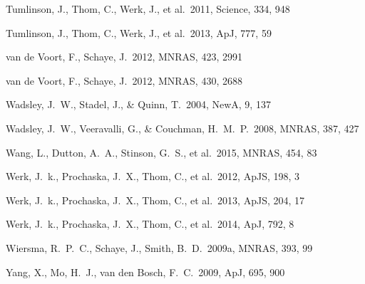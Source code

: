 \documentclass[useAMS,usenatbib]{mn2e}
\def \apj {ApJ}
\def \mnras {MNRAS}
\def \apjs {ApJS}
\def \na {NewA}
\begin{document}
\begin{thebibliography}{}
 Tumlinson, J., Thom, C., Werk, J., et al.\ 2011, Science, 334, 948

 Tumlinson, J., Thom, C., Werk, J., et al.\ 2013, \apj, 777, 59


%
 van de Voort, F., Schaye, J.\ 2012, \mnras, 423, 2991

%
 van de Voort, F., Schaye, J.\ 2012, \mnras, 430, 2688


 Wadsley, J.~W., Stadel, 
J., \& Quinn, T.\ 2004, \na, 9, 137 

 Wadsley, J.~W., 
Veeravalli, G., \& Couchman, H.~M.~P.\ 2008, \mnras, 387, 427 

 Wang, L., Dutton, A.~A.,  Stinson, G.~S., et al.\ 2015, \mnras, 454, 83
  
 Werk, J.~k., Prochaska, J.~X., Thom, C., et al.\ 2012, \apjs, 198, 3

 Werk, J.~k., Prochaska, J.~X., Thom, C., et al.\ 2013, \apjs, 204, 17

 Werk, J.~k., Prochaska, J.~X., Thom, C., et al.\ 2014, \apj, 792, 8

%
 Wiersma, R.~P.~C., Schaye, J., Smith, B.~D.\ 2009a, \mnras, 393, 99


 Yang, X., Mo, H.~J., van den Bosch, F.~C.\ 2009, \apj, 695, 900


\end{thebibliography}

\label{lastpage}
\end{document}
